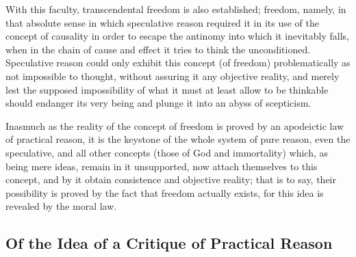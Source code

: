 \documentclass[12pt]{article}
\begin{document}
  With this faculty, transcendental freedom is also established;
freedom, namely, in that absolute sense in which speculative reason
required it in its use of the concept of causality in order to
escape the antinomy into which it inevitably falls, when in the
chain of cause and effect it tries to think the unconditioned.
Speculative reason could only exhibit this concept (of freedom)
problematically as not impossible to thought, without assuring it
any objective reality, and merely lest the supposed impossibility of
what it must at least allow to be thinkable should endanger its very
being and plunge it into an abyss of scepticism.

  Inasmuch as the reality of the concept of freedom is proved by an
apodeictic law of practical reason, it is the keystone of the whole
system of pure reason, even the speculative, and all other concepts
(those of God and immortality) which, as being mere ideas, remain in
it unsupported, now attach themselves to this concept, and by it
obtain consistence and objective reality; that is to say, their
possibility is proved by the fact that freedom actually exists, for
this idea is revealed by the moral law.

\subsection{Of the Idea of a Critique of Practical Reason}
\end{document}
